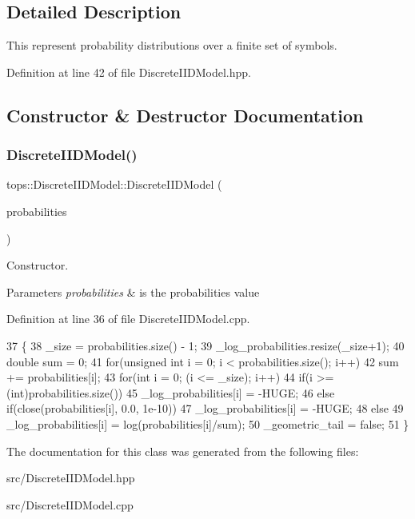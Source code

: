 \subsection{Detailed Description}
This represent probability distributions over a finite set of symbols. 

Definition at line 42 of file Discrete\+I\+I\+D\+Model.\+hpp.



\subsection{Constructor \& Destructor Documentation}
\mbox{\label{classtops_1_1DiscreteIIDModel_a229cd565d9c721d9524f3aff2a5a4532}} 
\subsubsection{\texorpdfstring{Discrete\+I\+I\+D\+Model()}{DiscreteIIDModel()}}
{\footnotesize\ttfamily tops\+::\+Discrete\+I\+I\+D\+Model\+::\+Discrete\+I\+I\+D\+Model (\begin{DoxyParamCaption}\item[{const Double\+Vector \&}]{probabilities }\end{DoxyParamCaption})}



Constructor. 


\begin{DoxyParams}{Parameters}
{\em probabilities} & is the probabilities value \\
\hline
\end{DoxyParams}


Definition at line 36 of file Discrete\+I\+I\+D\+Model.\+cpp.


\begin{DoxyCode}
37   \{
38     \_size = probabilities.size() - 1;
39     \_log\_probabilities.resize(\_size+1);
40     \textcolor{keywordtype}{double}  sum = 0;
41     \textcolor{keywordflow}{for}(\textcolor{keywordtype}{unsigned} \textcolor{keywordtype}{int} i = 0; i < probabilities.size(); i++)
42       sum += probabilities[i];
43     \textcolor{keywordflow}{for}(\textcolor{keywordtype}{int} i = 0; (i <= \_size); i++)
44       \textcolor{keywordflow}{if}(i >= (\textcolor{keywordtype}{int})probabilities.size())
45         \_log\_probabilities[i] = -HUGE;
46       \textcolor{keywordflow}{else} \textcolor{keywordflow}{if}(close(probabilities[i], 0.0, 1e-10))
47         \_log\_probabilities[i] = -HUGE;
48       \textcolor{keywordflow}{else}
49         \_log\_probabilities[i] = log(probabilities[i]/sum);
50      \_geometric\_tail = \textcolor{keyword}{false};
51   \}
\end{DoxyCode}


The documentation for this class was generated from the following files\+:\begin{DoxyCompactItemize}
\item 
src/Discrete\+I\+I\+D\+Model.\+hpp\item 
src/Discrete\+I\+I\+D\+Model.\+cpp\end{DoxyCompactItemize}
